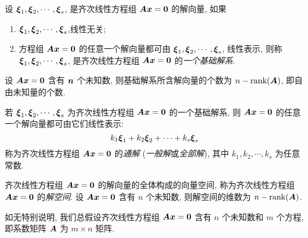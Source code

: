 \begin{definition}[齐次线性方程组的基础解系]
    设 $ \vb*{\xi}_1, \vb*{\xi}_2, \cdots ,\vb*{\xi}_s$, 是齐次线性方程组 $ \vb*{A x}=\vb*{0} $ 的解向量, 如果
    \begin{enumerate}[label=(\arabic{*})]
        \item $\vb*{\xi}_{1}, \vb*{\xi}_{2}, \cdots, \vb*{\xi}_s $,线性无关;
        \item 方程组 $ \vb*{A x}=\vb*{0} $ 的任意一个解向量都可由 $ \vb*{\xi}_{1}, \vb*{\xi}_{2}, \cdots, \vb*{\xi}_s $, 线性表示, 则称 $ \vb*{\xi}_{1}, \vb*{\xi}_{2}, \cdots, \vb*{\xi}_{s}$, 是齐次线性方程组 $\vb*{ A }\vb*{x}=\vb*{0} $ 的\textit{一个基础解系}.
    \end{enumerate}
\end{definition}

\begin{theorem}[基础解系的个数]
    设 $ \vb*{A x}=\vb*{0} $ 含有 $ \vb*{n} $ 个未知数, 则基础解系所含解向量的个数为 $ n-\rank(\vb*{A}) $, 即自由未知量的个数.
\end{theorem}

\begin{definition}[齐次方程组的通解]
    若 $ \vb*{\xi}_{1}, \vb*{\xi}_{2}, \cdots, \vb*{\xi}_{s} $ 为齐次线性方程组 $ \vb*{A x}=\vb*{0} $ 的一个基础解系, 则 $ \vb*{A x}=\vb*{0} $ 的任意一个解向量都可由它们线性表示:
    $$k_{1} \vb*{\xi}_{1}+k_{2} \vb*{\xi}_{2}+\cdots+k_{s} \vb*{\xi}_s$$
    称为齐次线性方程组 $ \vb*{A x}=\vb*{0} $ 的\textit{通解} (\textit{一般解}或\textit{全部解}), 其中 $ k_{1}, k_{2}, \cdots, k_s $ 为任意常数.
\end{definition}

\begin{definition}[齐次线性方程组的解空间]
    齐次线性方程组 $ \vb*{A x}=\vb*{0} $ 的解向量的全体构成的向量空间, 称为齐次线性方程组 $ \vb*{A x}=\vb*{0} $ 的\textit{解空间}. 设 $ \vb*{A} \vb*{x}=\vb*{0} $ 含有 $ n $ 个未知数, 则解空间的维数为 $ n-\rank(\vb*{A}) $.
\end{definition}

如无特别说明, 我们总假设齐次线性方程组 $ \vb*{A x}=\vb*{0} $ 含有 $ n $ 个未知数和 $ m $ 个方程, 即系数矩阵 $ \vb*{A }$ 为 $ m \times n $ 矩阵.

